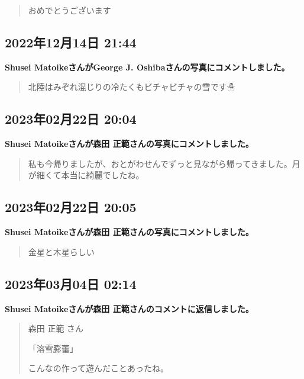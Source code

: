 \begin{quote}
おめでとうございます🎊
\end{quote}

\subsection*{2022年12月14日 21:44}

\textbf{Shusei MatoikeさんがGeorge J. Oshibaさんの写真にコメントしました。}

\begin{quote}
北陸はみぞれ混じりの冷たくもビチャビチャの雪です☃
\end{quote}

\subsection*{2023年02月22日 20:04}

\textbf{Shusei Matoikeさんが森田 正範さんの写真にコメントしました。}

\begin{quote}
私も今帰りましたが、おとがわせんでずっと見ながら帰ってきました。月が細くて本当に綺麗でしたね。
\end{quote}

\subsection*{2023年02月22日 20:05}

\textbf{Shusei Matoikeさんが森田 正範さんの写真にコメントしました。}

\begin{quote}
金星と木星らしい
\end{quote}

\subsection*{2023年03月04日 02:14}

\textbf{Shusei Matoikeさんが森田 正範さんのコメントに返信しました。}

\begin{quote}
森田 正範 さん

「溶雪膨蕾」

こんなの作って遊んだことあったね。
\end{quote}

